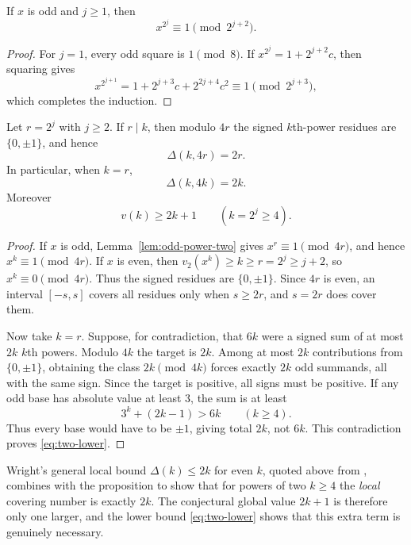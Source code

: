\documentclass[../Axiomathic.tex]{subfiles}
\begin{document}
\begin{lemma}\label{lem:odd-power-two}
If $x$ is odd and $j\ge1$, then
\[
  x^{2^j}\equiv1\pmod{2^{j+2}}.
\]
\end{lemma}

\begin{proof}
For $j=1$, every odd square is $1\pmod8$.  If
$x^{2^j}=1+2^{j+2}c$, then squaring gives
\[
 x^{2^{j+1}}=1+2^{j+3}c+2^{2j+4}c^2\equiv1\pmod{2^{j+3}},
\]
which completes the induction.
\end{proof}

\begin{prop}\label{prop:two-resonance}
Let $r=2^j$ with $j\ge2$.  If $r\mid k$, then modulo $4r$ the signed $k$th-power residues are $\{0,\pm1\}$, and hence
\[
  \Delta(k,4r)=2r.
\]
In particular, when $k=r$,
\[
  \Delta(k,4k)=2k.
\]
Moreover
\begin{equation}\label{eq:two-lower}
  \boxed{v(k)\ge2k+1\qquad(k=2^j\ge4).}
\end{equation}
\end{prop}

\begin{proof}
If $x$ is odd, Lemma~\ref{lem:odd-power-two} gives $x^r\equiv1\pmod{4r}$, and hence $x^k\equiv1\pmod{4r}$.  If $x$ is even, then $v_2(x^k)\ge k\ge r=2^j\ge j+2$, so $x^k\equiv0\pmod{4r}$.  Thus the signed residues are $\{0,\pm1\}$.  Since $4r$ is even, an interval $[-s,s]$ covers all residues only when $s\ge2r$, and $s=2r$ does cover them.

Now take $k=r$.  Suppose, for contradiction, that $6k$ were a signed sum of at most $2k$ $k$th powers.  Modulo $4k$ the target is $2k$.  Among at most $2k$ contributions from $\{0,\pm1\}$, obtaining the class $2k\pmod{4k}$ forces exactly $2k$ odd summands, all with the same sign.  Since the target is positive, all signs must be positive.  If any odd base has absolute value at least $3$, the sum is at least
\[
  3^k+(2k-1)>6k\qquad(k\ge4).
\]
Thus every base would have to be $\pm1$, giving total $2k$, not $6k$.  This contradiction proves \eqref{eq:two-lower}.
\end{proof}

Wright's general local bound $\Delta(k)\le2k$ for even $k$, quoted above from \cite{Borwein2002}, combines with the proposition to show that for powers of two $k\ge4$ the \emph{local} covering number is exactly $2k$.  The conjectural global value $2k+1$ is therefore only one larger, and the lower bound \eqref{eq:two-lower} shows that this extra term is genuinely necessary.
\end{document}

